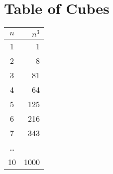 \section{Table of Cubes}

\begin{center}
    \large
    \begin{tabular}{cr}
        \toprule
        $n$ & $n^3$ \\
        \midrule
        1 &  1 \\
        2 &  8 \\
        3 &  81 \\
        4 &  64 \\
        5 &  125 \\
        6 &  216 \\
        7 &  343 \\
        \dots & \\
        10 & 1000 \\
        \bottomrule
    \end{tabular}
\end{center}
